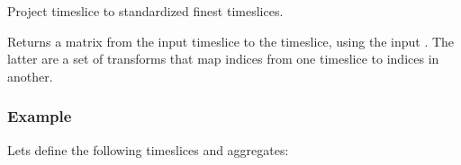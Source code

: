 \documentclass[letterpaper,10pt,english]{sphinxmanual}
\begin{document}
\begin{fulllineitems}
\label{\detokenize{api:muse.timeslices.timeslice_projector}}
Project time\sphinxhyphen{}slice to standardized finest time\sphinxhyphen{}slices.

Returns a matrix from the input timeslice  to the  timeslice, using
the input . The latter are a set of transforms that map indices from
one timeslice to indices in another.
\subsubsection*{Example}

Lets define the following timeslices and aggregates:


\end{fulllineitems}
\end{document}
